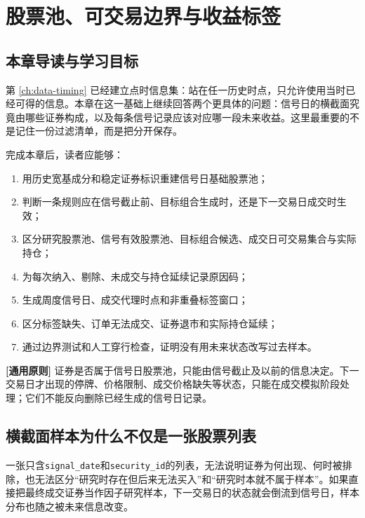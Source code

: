 \chapter{股票池、可交易边界与收益标签}
\label{ch:universe-labels}

\section{本章导读与学习目标}

第 \cref{ch:data-timing} 已经建立点时信息集：站在任一历史时点，只允许使用当时已经可得的信息。本章在这一基础上继续回答两个更具体的问题：信号日的横截面究竟由哪些证券构成，以及每条信号记录应该对应哪一段未来收益。这里最重要的不是记住一份过滤清单，而是把分开保存。

完成本章后，读者应能够：

\begin{enumerate}
  \item 用历史宽基成分和稳定证券标识重建信号日基础股票池；
  \item 判断一条规则应在信号截止前、目标组合生成时，还是下一交易日成交时生效；
  \item 区分研究股票池、信号有效股票池、目标组合候选、成交日可交易集合与实际持仓；
  \item 为每次纳入、剔除、未成交与持仓延续记录原因码；
  \item 生成周度信号日、成交代理时点和非重叠标签窗口；
  \item 区分标签缺失、订单无法成交、证券退市和实际持仓延续；
  \item 通过边界测试和人工穿行检查，证明没有用未来状态改写过去样本。
\end{enumerate}

\begin{principlebox}
\textbf{[通用原则]} 证券是否属于信号日股票池，只能由信号截止及以前的信息决定。下一交易日才出现的停牌、价格限制、成交价格缺失等状态，只能在成交模拟阶段处理；它们不能反向删除已经生成的信号日记录。
\end{principlebox}

\section{横截面样本为什么不仅是一张股票列表}

一张只含\texttt{signal\_date}和\texttt{security\_id}的列表，无法说明证券为何出现、何时被排除，也无法区分“研究时存在但后来无法买入”和“研究时本就不属于样本”。如果直接把最终成交证券当作因子研究样本，下一交易日的状态就会倒流到信号日，样本分布也随之被未来信息改变。

